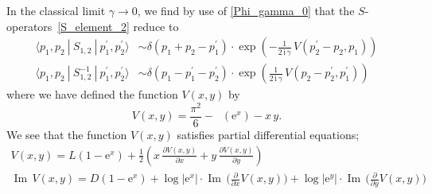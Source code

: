 \documentclass[12pt,reqno]{amsart}
\numberwithin{equation}{section}
\renewcommand{\Im}{\operatorname{Im}}
\DeclareMathOperator{\Li}{Li_2}
\newcommand{\I}{\mathrm{i}}
\newcommand{\E}{\mathrm{e}}
\begin{document}
In the classical limit $\gamma \to 0$, we find 
by use of \eqref{Phi_gamma_0}
that the $S$-operators~\eqref{S_element_2} 
reduce to
\begin{subequations}
  \label{S_asymptotics}
  \begin{align}
    \langle p_1 , p_2 \ | \ S_{1,2}  \ | \ p_1^\prime , p_2^\prime \rangle
    & \sim
    \delta(p_1 + p_2 - p_1^\prime) \cdot
    \exp
    \left(
      - \frac{1}{2 \, \I \, \gamma}
      \, V(p_2^\prime - p_2 , p_1)
    \right) 
  \\[2mm]
%
  \langle p_1 , p_2 \  | \ S_{1,2}^{-1} \ | \ p_1^\prime , p_2^\prime \rangle
  &
  \sim
  \delta(p_1 - p_1^\prime - p_2^\prime) \cdot
  \exp
  \left(
    \frac{1}{ 2 \, \I \, \gamma} \,
    V(p_2 - p_2^\prime , p_1^\prime)
  \right) 
\end{align}
\end{subequations}
where we have defined  the function $V(x,y)$ by
\begin{equation}
  V(x,y)
  =
  \frac{\pi^2}{6} - \Li(\E^x) - x \, y .
\end{equation}
We see that the function $V(x,y)$ satisfies partial differential
equations;
\begin{gather}
  \label{V_partial}
  V(x,y)
  =
  L(1- \E^x)
    +
    \frac{1}{2}
    \left(
      x \, \frac{\partial V(x,y)}{\partial x}
      +
      y \, \frac{\partial V(x,y)}{\partial y}
    \right) 
    \\[3mm]
%
    \label{imaginary_V_saddle}
    \Im \, V(x,y)
    =
    D(1-\E^x)
    +
    \log | \E^x | \cdot
    \Im \, \biggl( \frac{\partial}{\partial x} V(x,y) \biggr) 
    +
    \log | \E^y | \cdot
    \Im \, \biggl( \frac{\partial}{\partial y} V(x,y) \biggr) 
  \end{gather}
\end{document}
